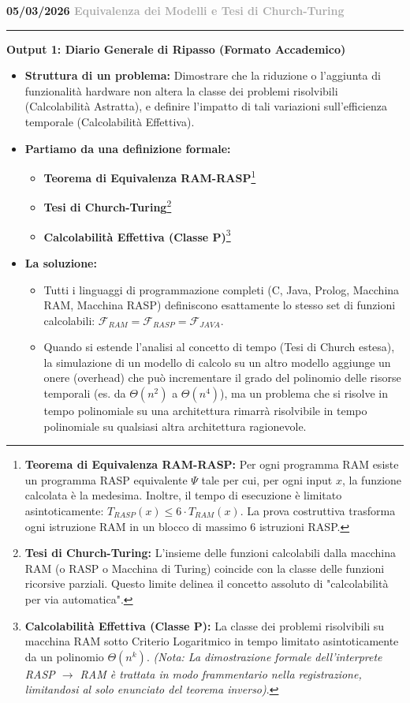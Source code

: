 \documentclass[a4paper, 11pt]{report}
\newcommand{\lezione}[2]{
\vspace{2em}
\noindent\textbf{\Large #1 \hfill \textcolor{darkgray}{#2}}
\vspace{0.5em}
\hrule
\vspace{1.5em}
}
\newcommand{\definizione}[2]{%
\textbf{#1}\footnote{\textbf{#1:} #2}%
}
\begin{document}
\lezione{05/03/2026}{Equivalenza dei Modelli e Tesi di Church-Turing}
\vspace{0.5cm}
\textbf{Output 1: Diario Generale di Ripasso (Formato Accademico)}
\begin{itemize}
\item \textbf{Struttura di un problema:}
Dimostrare che la riduzione o l'aggiunta di funzionalità hardware non altera la classe dei problemi risolvibili (Calcolabilità Astratta), e definire l'impatto di tali variazioni sull'efficienza temporale (Calcolabilità Effettiva).

\item \textbf{Partiamo da una definizione formale:}
\begin{itemize}
    \item \definizione{Teorema di Equivalenza RAM-RASP}{Per ogni programma RAM esiste un programma RASP equivalente $\Psi$ tale per cui, per ogni input $x$, la funzione calcolata è la medesima. Inoltre, il tempo di esecuzione è limitato asintoticamente: $T_{RASP}(x) \le 6 \cdot T_{RAM}(x)$. La prova costruttiva trasforma ogni istruzione RAM in un blocco di massimo 6 istruzioni RASP.}
    \item \definizione{Tesi di Church-Turing}{L'insieme delle funzioni calcolabili dalla macchina RAM (o RASP o Macchina di Turing) coincide con la classe delle funzioni ricorsive parziali. Questo limite delinea il concetto assoluto di "calcolabilità per via automatica".}
    \item \definizione{Calcolabilità Effettiva (Classe P)}{La classe dei problemi risolvibili su macchina RAM sotto Criterio Logaritmico in tempo limitato asintoticamente da un polinomio $\Theta(n^k)$. \textit{(Nota: La dimostrazione formale dell'interprete RASP $\rightarrow$ RAM è trattata in modo frammentario nella registrazione, limitandosi al solo enunciato del teorema inverso)}.}
\end{itemize}

\item \textbf{La soluzione:}
\begin{itemize}
    \item Tutti i linguaggi di programmazione completi (C, Java, Prolog, Macchina RAM, Macchina RASP) definiscono esattamente lo stesso set di funzioni calcolabili: $\mathcal{F}_{RAM} = \mathcal{F}_{RASP} = \mathcal{F}_{JAVA}$.
    \item Quando si estende l'analisi al concetto di tempo (Tesi di Church estesa), la simulazione di un modello di calcolo su un altro modello aggiunge un onere (overhead) che può incrementare il grado del polinomio delle risorse temporali (es. da $\Theta(n^2)$ a $\Theta(n^4)$), ma un problema che si risolve in tempo polinomiale su una architettura rimarrà risolvibile in tempo polinomiale su qualsiasi altra architettura ragionevole.
\end{itemize}
\end{itemize}
\end{document}
